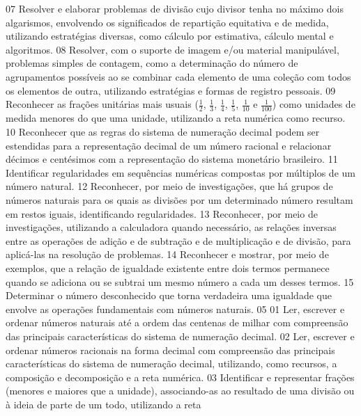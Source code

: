 {{{			}
			{07}{%
				Resolver e elaborar problemas de divisão cujo divisor tenha no máximo dois algarismos,
				envolvendo os significados de repartição equitativa e de medida, utilizando estratégias diversas,
				como cálculo por estimativa, cálculo mental e algoritmos.
			}
			{08}{%
				Resolver, com o suporte de imagem e/ou material manipulável, problemas simples
				de contagem, como a determinação do número de agrupamentos possíveis ao se combinar cada
				elemento de uma coleção com todos os elementos de outra, utilizando estratégias e formas de
				registro pessoais.
			}
			{09}{%
				Reconhecer as frações unitárias mais usuais (\(\frac{1}{2}\), \(\frac{1}{3}\), \(\frac{1}{4}\), \(\frac{1}{5}\), \(\frac{1}{10}\) e \(\frac{1}{100}\)) como
				unidades de medida menores do que uma unidade, utilizando a reta numérica como recurso.
			}
			{10}{%
				Reconhecer que as regras do sistema de numeração decimal podem ser estendidas
				para a representação decimal de um número racional e relacionar décimos e centésimos com a
				representação do sistema monetário brasileiro.
			}
			{11}{%
				Identificar regularidades em sequências numéricas compostas por múltiplos de um
				número natural.
			}
			{12}{%
				Reconhecer, por meio de investigações, que há grupos de números naturais para os
				quais as divisões por um determinado número resultam em restos iguais, identificando regularidades.
			}
			{13}{%
				Reconhecer, por meio de investigações, utilizando a calculadora quando necessário, as
				relações inversas entre as operações de adição e de subtração e de multiplicação e de divisão, para
				aplicá-las na resolução de problemas.
			}
			{14}{%
				Reconhecer e mostrar, por meio de exemplos, que a relação de igualdade existente
				entre dois termos permanece quando se adiciona ou se subtrai um mesmo número a cada um desses
				termos.
			}
			{15}{%
				Determinar o número desconhecido que torna verdadeira uma igualdade que envolve as
				operações fundamentais com números naturais.
			}
	}
	{05}{%
		{01}{%
				Ler, escrever e ordenar números naturais até a ordem das centenas de milhar com
				compreensão das principais características do sistema de numeração decimal.
			}
			{02}{%
				Ler, escrever e ordenar números racionais na forma decimal com compreensão
				das principais características do sistema de numeração decimal, utilizando, como recursos, a
				composição e decomposição e a reta numérica.
			}
			{03}{%
				Identificar e representar frações (menores e maiores que a unidade),
				associando-as ao resultado de uma divisão ou à ideia de parte de um todo, utilizando a reta
}}}
